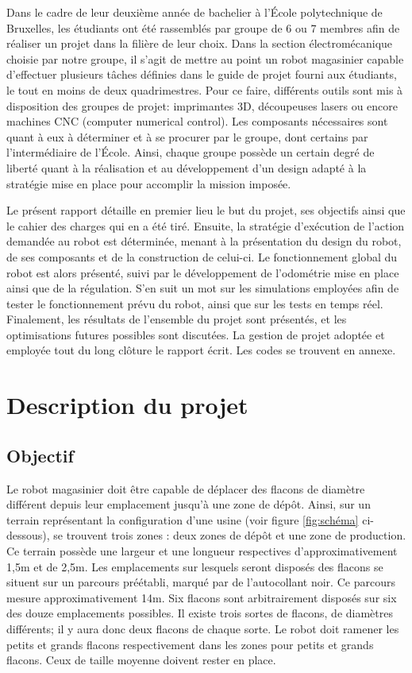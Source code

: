 \documentclass[a4paper,11pt]{article}
\begin{document}
Dans le cadre de leur deuxième année de bachelier à l'École polytechnique de Bruxelles, les étudiants ont été rassemblés par groupe de 6 ou 7 membres afin de réaliser un projet dans la filière de leur choix. Dans la section électromécanique choisie par notre groupe, il s'agit de mettre au point un robot magasinier capable d'effectuer plusieurs tâches définies dans le guide de projet fourni aux étudiants, le tout en moins de deux quadrimestres. Pour ce faire, différents outils sont mis à disposition des groupes de projet: imprimantes 3D, découpeuses lasers ou encore machines CNC (computer numerical control). Les composants nécessaires sont quant à eux à déterminer et à se procurer par le groupe, dont certains par l'intermédiaire de l'École. Ainsi, chaque groupe possède un certain degré de liberté quant à la réalisation et au développement d'un design adapté à la stratégie mise en place pour accomplir la mission imposée.

Le présent rapport détaille en premier lieu le but du projet, ses objectifs ainsi que le cahier des charges qui en a été tiré. Ensuite, la stratégie d'exécution de l'action demandée au robot est déterminée, menant à la présentation du design du robot, de ses composants et de la construction de celui-ci. Le fonctionnement global du robot est alors présenté, suivi par le développement de l'odométrie mise en place ainsi que de la régulation. S'en suit un mot sur les simulations employées afin de tester le fonctionnement prévu du robot, ainsi que sur les tests en temps réel. Finalement, les résultats de l'ensemble du projet sont présentés, et les optimisations futures possibles sont discutées. La gestion de projet adoptée et employée tout du long clôture le rapport écrit. Les codes se trouvent en annexe.

\clearpage
\section{\label{sec: desc}Description du projet}

\subsection{Objectif}

Le robot magasinier doit être capable de déplacer des flacons de diamètre différent depuis leur emplacement jusqu'à une zone de dépôt. Ainsi, sur un terrain représentant la configuration d'une usine (voir figure \ref{fig:schéma} ci-dessous), se trouvent trois zones : deux zones de dépôt et une zone de production. Ce terrain possède une largeur et une longueur respectives d'approximativement 1,5m et de 2,5m. Les emplacements sur lesquels seront disposés des flacons se situent sur un parcours préétabli, marqué par de l'autocollant noir. Ce parcours mesure approximativement 14m. Six flacons sont arbitrairement disposés sur six des douze emplacements possibles. Il existe trois sortes de flacons, de diamètres différents; il y aura donc deux flacons de chaque sorte. Le robot doit ramener les petits et grands flacons respectivement dans les zones pour petits et grands flacons. Ceux de taille moyenne doivent rester en place.
\end{document}
